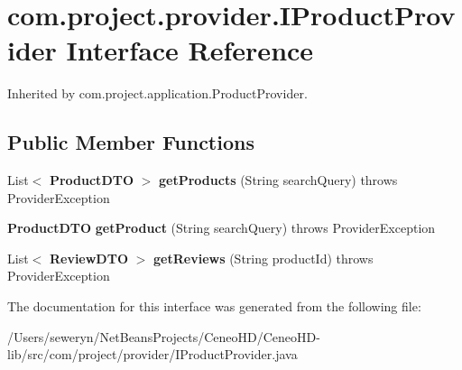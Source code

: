 \section{com.\+project.\+provider.\+I\+Product\+Provider Interface Reference}
\label{interfacecom_1_1project_1_1provider_1_1_i_product_provider}


Inherited by com.\+project.\+application.\+Product\+Provider.

\subsection*{Public Member Functions}
\begin{DoxyCompactItemize}
\item 
\mbox{\label{interfacecom_1_1project_1_1provider_1_1_i_product_provider_aa4546c41560338d0634886d4cc7f76db}} 
List$<$ \textbf{ Product\+D\+TO} $>$ {\bfseries get\+Products} (String search\+Query)  throws Provider\+Exception
\item 
\mbox{\label{interfacecom_1_1project_1_1provider_1_1_i_product_provider_acc66de52719bc51cf52bdfb7101d1568}} 
\textbf{ Product\+D\+TO} {\bfseries get\+Product} (String search\+Query)  throws Provider\+Exception
\item 
\mbox{\label{interfacecom_1_1project_1_1provider_1_1_i_product_provider_a0deabe3ac87eb878a31f859b60eeafc5}} 
List$<$ \textbf{ Review\+D\+TO} $>$ {\bfseries get\+Reviews} (String product\+Id)  throws Provider\+Exception
\end{DoxyCompactItemize}


The documentation for this interface was generated from the following file\+:\begin{DoxyCompactItemize}
\item 
/\+Users/seweryn/\+Net\+Beans\+Projects/\+Ceneo\+H\+D/\+Ceneo\+H\+D-\/lib/src/com/project/provider/I\+Product\+Provider.\+java\end{DoxyCompactItemize}

